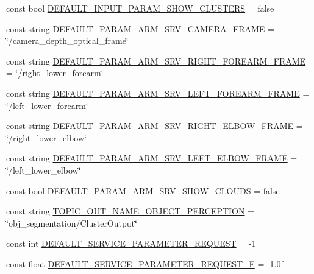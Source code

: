 \begin{DoxyCompactItemize}
\item 
const bool \hyperlink{namespacesrvm_aef053199a3f95b1da712ef187b096f93}{D\-E\-F\-A\-U\-L\-T\-\_\-\-I\-N\-P\-U\-T\-\_\-\-P\-A\-R\-A\-M\-\_\-\-S\-H\-O\-W\-\_\-\-C\-L\-U\-S\-T\-E\-R\-S} = false
\item 
const string \hyperlink{namespacesrvm_a9ae9e53a20ec9335fe07c1a42520198e}{D\-E\-F\-A\-U\-L\-T\-\_\-\-P\-A\-R\-A\-M\-\_\-\-A\-R\-M\-\_\-\-S\-R\-V\-\_\-\-C\-A\-M\-E\-R\-A\-\_\-\-F\-R\-A\-M\-E} = \char`\"{}/camera\-\_\-depth\-\_\-optical\-\_\-frame\char`\"{}
\item 
const string \hyperlink{namespacesrvm_a6e203b3aafd97558c58ada022c9cc514}{D\-E\-F\-A\-U\-L\-T\-\_\-\-P\-A\-R\-A\-M\-\_\-\-A\-R\-M\-\_\-\-S\-R\-V\-\_\-\-R\-I\-G\-H\-T\-\_\-\-F\-O\-R\-E\-A\-R\-M\-\_\-\-F\-R\-A\-M\-E} = \char`\"{}/right\-\_\-lower\-\_\-forearm\char`\"{}
\item 
const string \hyperlink{namespacesrvm_af63966bf248ec14ccf2a2ca74fa1214d}{D\-E\-F\-A\-U\-L\-T\-\_\-\-P\-A\-R\-A\-M\-\_\-\-A\-R\-M\-\_\-\-S\-R\-V\-\_\-\-L\-E\-F\-T\-\_\-\-F\-O\-R\-E\-A\-R\-M\-\_\-\-F\-R\-A\-M\-E} = \char`\"{}/left\-\_\-lower\-\_\-forearm\char`\"{}
\item 
const string \hyperlink{namespacesrvm_acb12c9f4a5661db79a05ea222c83e215}{D\-E\-F\-A\-U\-L\-T\-\_\-\-P\-A\-R\-A\-M\-\_\-\-A\-R\-M\-\_\-\-S\-R\-V\-\_\-\-R\-I\-G\-H\-T\-\_\-\-E\-L\-B\-O\-W\-\_\-\-F\-R\-A\-M\-E} = \char`\"{}/right\-\_\-lower\-\_\-elbow\char`\"{}
\item 
const string \hyperlink{namespacesrvm_ab8271bafa5b004c13196b24b77cef53a}{D\-E\-F\-A\-U\-L\-T\-\_\-\-P\-A\-R\-A\-M\-\_\-\-A\-R\-M\-\_\-\-S\-R\-V\-\_\-\-L\-E\-F\-T\-\_\-\-E\-L\-B\-O\-W\-\_\-\-F\-R\-A\-M\-E} = \char`\"{}/left\-\_\-lower\-\_\-elbow\char`\"{}
\item 
const bool \hyperlink{namespacesrvm_a7fdc748a5c9f8f7211d6e32e64f96c63}{D\-E\-F\-A\-U\-L\-T\-\_\-\-P\-A\-R\-A\-M\-\_\-\-A\-R\-M\-\_\-\-S\-R\-V\-\_\-\-S\-H\-O\-W\-\_\-\-C\-L\-O\-U\-D\-S} = false
\item 
const string \hyperlink{namespacesrvm_a520b8813dc65ba764d59f05a0b316e5c}{T\-O\-P\-I\-C\-\_\-\-O\-U\-T\-\_\-\-N\-A\-M\-E\-\_\-\-O\-B\-J\-E\-C\-T\-\_\-\-P\-E\-R\-C\-E\-P\-T\-I\-O\-N} = \char`\"{}obj\-\_\-segmentation/Cluster\-Output\char`\"{}
\item 
const int \hyperlink{namespacesrvm_a27b2693a98ba8791767e3c8bebdab105}{D\-E\-F\-A\-U\-L\-T\-\_\-\-S\-E\-R\-V\-I\-C\-E\-\_\-\-P\-A\-R\-A\-M\-E\-T\-E\-R\-\_\-\-R\-E\-Q\-U\-E\-S\-T} = -\/1
\item 
const float \hyperlink{namespacesrvm_a5a9ae08c1a139bbf76b39c5d34f90e2a}{D\-E\-F\-A\-U\-L\-T\-\_\-\-S\-E\-R\-V\-I\-C\-E\-\_\-\-P\-A\-R\-A\-M\-E\-T\-E\-R\-\_\-\-R\-E\-Q\-U\-E\-S\-T\-\_\-\-F} = -\/1.\-0f

\end{DoxyCompactItemize}
